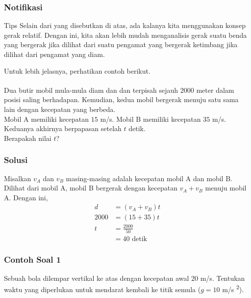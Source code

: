 \documentclass[10pt,aspectratio=54]{beamer}
\begin{document}
\begin{frame}
\frametitle{Notifikasi}
\begin{block}{Tips}
Selain dari yang disebutkan di atas, ada kalanya kita menggunakan konsep gerak relatif. Dengan ini, kita akan lebih mudah menganalisis gerak suatu benda yang bergerak jika dilihat dari suatu pengamat yang bergerak ketimbang jika dilihat dari pengamat yang diam.
\end{block}
Untuk lebih jelasnya, perhatikan contoh berikut.\\~\\
Dua butir mobil mula-mula diam dan dan terpisah sejauh 2000 meter dalam posisi saling berhadapan. Kemudian, kedua mobil bergerak menuju satu sama lain dengan kecepatan yang berbeda. \\ Mobil A memiliki kecepatan $15$ m/s. Mobil B memiliki kecepatan $35$ m/s. Keduanya akhirnya berpapasan setelah $t$ detik. \\ Berapakah nilai $t$?
\end{frame}

\begin{frame}
\frametitle{Solusi}
 Misalkan $v_A$ dan $v_B$ masing-masing adalah kecepatan mobil A dan mobil B. Dilihat dari mobil A, mobil B bergerak dengan kecepatan $v_A+v_B$ menuju mobil A. Dengan ini, 
 \begin{align*}
  d&=(v_A+v_B) t \\
  2000&=(15+35)t \\
  t&=\frac{2000}{50}\\
   &=\boxed{40\text{ detik}}
 \end{align*}
\end{frame}

\begin{frame}
\frametitle{Contoh Soal 1}
Sebuah bola dilempar vertikal ke atas dengan kecepatan awal $20$ m/s. Tentukan waktu yang diperlukan untuk mendarat kembali ke titik semula ($g=10$ m/s \textsuperscript{2}).
\end{frame}
\end{document}
